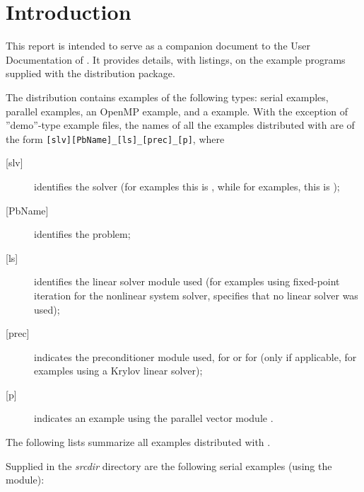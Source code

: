 \section{Introduction}\label{s:ex_intro}

This report is intended to serve as a companion document to the User
Documentation of {\cvode} \cite{cvode_ug}.  It provides details, with
listings, on the example programs supplied with the {\cvode} distribution
package.

The {\cvode} distribution contains examples of the following types: serial
{\CC} examples, parallel {\CC} examples, an OpenMP example, and a {\hypre}
example.
With the exception of ''demo''-type example files, the names of all the examples
distributed with {\sundials} are of the form \verb![slv][PbName]_[ls]_[prec]_[p]!,
where
\begin{description}
\item [{[slv]}] identifies the solver (for {\cvode} examples this is ,
  while for {\fcvode} examples, this is );
\item [{[PbName]}] identifies the problem;
\item [{[ls]}] identifies the linear solver module used (for examples using
  fixed-point iteration for the nonlinear system solver,  specifies
  that no linear solver was used);
\item [{[prec]}] indicates the {\cvode} preconditioner module used,  for {\cvbandpre}
  or  for {\cvbbdpre}
  (only if applicable, for examples using a Krylov linear solver);
\item [{[p]}] indicates an example using the parallel vector module {\nvecp}.
\end{description}

\vspace{0.2in}\noindent
The following lists summarize all examples distributed with {\cvode}.

\vspace{0.2in}\noindent
Supplied in the {\em srcdir} directory are the
following serial examples (using the {\nvecs} module):

